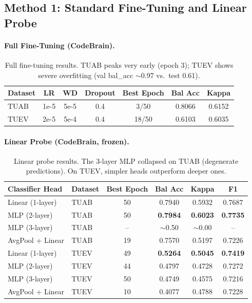 \documentclass{article}
\begin{document}
\subsection{Method 1: Standard Fine-Tuning and Linear Probe}

\paragraph{Full Fine-Tuning (CodeBrain).}
\begin{table}[h]
\centering
\small
\begin{tabular}{@{}lcccccc@{}}
\toprule
Dataset & LR & WD & Dropout & Best Epoch & Bal Acc & Kappa \\
\midrule
TUAB & 1e-5 & 5e-5 & 0.4 & 3/50 & 0.8066 & 0.6152 \\
TUEV & 2e-5 & 5e-4 & 0.4 & 18/50 & 0.6103 & 0.6035 \\
\bottomrule
\end{tabular}
\caption{Full fine-tuning results. TUAB peaks very early (epoch 3); TUEV shows severe overfitting (val bal\_acc $\sim$0.97 vs.\ test 0.61).}
\end{table}

\paragraph{Linear Probe (CodeBrain, frozen).}
\begin{table}[h]
\centering
\small
\begin{tabular}{@{}llcccc@{}}
\toprule
Classifier Head & Dataset & Best Epoch & Bal Acc & Kappa & F1 \\
\midrule
Linear (1-layer) & TUAB & 50 & 0.7940 & 0.5932 & 0.7687 \\
MLP (2-layer) & TUAB & 50 & \textbf{0.7984} & \textbf{0.6023} & \textbf{0.7735} \\
MLP (3-layer) & TUAB & -- & $\sim$0.50 & $\sim$0.00 & -- \\
AvgPool + Linear & TUAB & 19 & 0.7570 & 0.5197 & 0.7226 \\
\midrule
Linear (1-layer) & TUEV & 49 & \textbf{0.5264} & \textbf{0.5045} & \textbf{0.7419} \\
MLP (2-layer) & TUEV & 44 & 0.4797 & 0.4728 & 0.7272 \\
MLP (3-layer) & TUEV & 50 & 0.4749 & 0.4575 & 0.7216 \\
AvgPool + Linear & TUEV & 10 & 0.4077 & 0.4788 & 0.7228 \\
\bottomrule
\end{tabular}
\caption{Linear probe results. The 3-layer MLP collapsed on TUAB (degenerate predictions). On TUEV, simpler heads outperform deeper ones.}
\end{table}
\end{document}
